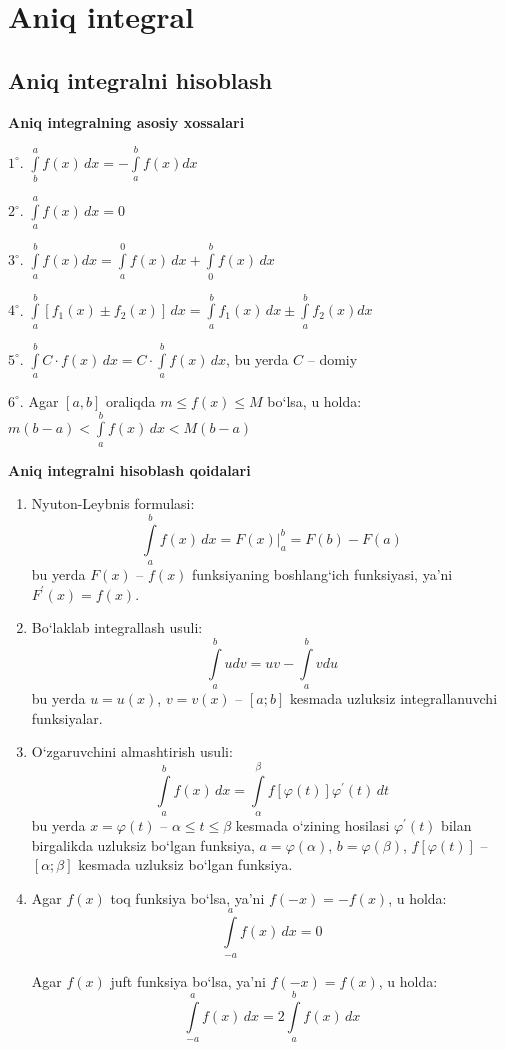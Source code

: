 \chapter{Aniq integral}
\section{Aniq integralni hisoblash}

\textbf{Aniq integralning asosiy xossalari}

$1^{\circ}$. $\int\limits_{b}^{a}f(x)\,dx=-\int\limits_{a}^{b}f(x)dx$

$2^{\circ}$. $\int\limits_{a}^{a}f(x)\,dx=0$ 

$3^{\circ}$. $\int\limits_{a}^{b}f(x)dx=\int\limits_{a}^{0}f(x)\,dx+\int\limits_{0}^{b}f(x)\,dx$

$4^{\circ}$. $\int\limits_{a}^{b}\left[f_{1}(x)\pm f_{2}(x)\right]\,dx=\int\limits_{a}^{b}f_{1}(x)\,dx\pm\int\limits_{a}^{b}f_{2}(x)dx$

$5^{\circ}$. $\int\limits_{a}^{b}C\cdot f(x)\,dx=C\cdot\int\limits_{a}^{b}f(x)\,dx$, bu yerda $C$ -- domiy

$6^{\circ}$. Agar $[a,b]$ oraliqda  $m\le f(x)\le M$ bo`lsa, u holda:
$m(b-a)<\int\limits_{a}^{b}f(x)\,dx<M(b-a)$

\textbf{Aniq integralni hisoblash qoidalari}
\begin{enumerate}
	\item Nyuton-Leybnis formulasi:
	$$\int\limits_{a}^{b}f(x)\,dx=F(x)\Big|_{a}^{b}=F(b)-F(a)$$
	bu yerda $F(x)$ -- $f(x)$ funksiyaning boshlang`ich funksiyasi, ya'ni $F^{\prime}(x)=f(x)$.
	\item Bo`laklab integrallash usuli:
	$$\int\limits_{a}^{b}udv=uv-\int\limits_{a}^{b}vdu$$
	bu yerda $u=u(x)$, $v=v(x)$ -- $[a;b]$ kesmada uzluksiz integrallanuvchi funksiyalar.
	\item O`zgaruvchini almashtirish usuli:
	$$\int\limits_{a}^{b}f(x)\,dx=\int\limits_{\alpha}^{\beta}f[\varphi(t)]\varphi^{\prime}(t)\,dt$$
	bu yerda $x=\varphi(t)$ -- $\alpha\le t\le\beta$ kesmada o`zining hosilasi $\varphi^{\prime}(t)$ bilan birgalikda uzluksiz bo`lgan funksiya, $a=\varphi(\alpha)$, $b=\varphi(\beta)$, $f[\varphi(t)]$ -- $[\alpha;\beta]$ kesmada uzluksiz bo`lgan funksiya.
	
	\item Agar $f(x)$ toq funksiya bo`lsa, ya'ni $f(-x)=-f(x)$, u holda:
	$$\int\limits_{-a}^{a}f(x)\,dx=0$$
	
	Agar $f(x)$ juft funksiya bo`lsa, ya'ni $f(-x)=f(x)$, u holda:
	$$\int\limits_{-a}^{a}f(x)\,dx=2\int\limits_{a}^{b}f(x)\,dx$$
\end{enumerate}

